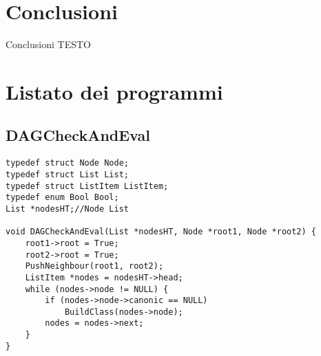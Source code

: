 \documentclass[12pt,a4paper,openright,twoside]{report}
\renewcommand{\chaptermark}[1]{\markboth{\thechapter.\ #1}{}}
\begin{document}
\clearpage{\pagestyle{empty}\cleardoublepage}
\chapter{Conclusioni}                %
\lhead[\fancyplain{}{\bfseries\thepage}]{\fancyplain{}{\bfseries\rightmark}}

Conclusioni TESTO



\clearpage{\pagestyle{empty}\cleardoublepage}

\renewcommand{\chaptermark}[1]{\markright{\thechapter \ #1}{}}
\lhead[\fancyplain{}{\bfseries\thepage}]{\fancyplain{}{\bfseries\rightmark}}
\appendix                               %
\chapter{Listato dei programmi}               %


\section{DAGCheckAndEval}
\begin{verbatim}
typedef struct Node Node;
typedef struct List List;
typedef struct ListItem ListItem;
typedef enum Bool Bool;
List *nodesHT;//Node List

void DAGCheckAndEval(List *nodesHT, Node *root1, Node *root2) {
    root1->root = True;
    root2->root = True;
    PushNeighbour(root1, root2);
    ListItem *nodes = nodesHT->head;
    while (nodes->node != NULL) {
        if (nodes->node->canonic == NULL)
            BuildClass(nodes->node);
        nodes = nodes->next;
    }
}
\end{verbatim}
\end{document}
